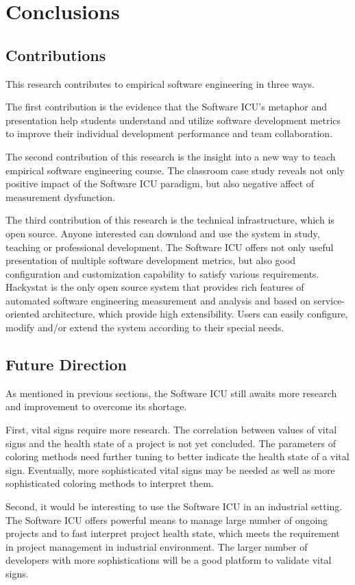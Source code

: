 \chapter{Conclusions}

\section{Contributions}
This research contributes to empirical software engineering in three ways.

The first contribution is the evidence that the Software ICU's metaphor and presentation help students understand and utilize software development metrics to improve their individual development performance and team collaboration.

The second contribution of this research is the insight into a new way to teach empirical software engineering course. The classroom case study reveals not only positive impact of the Software ICU paradigm, but also negative affect of measurement dysfunction.

The third contribution of this research is the technical infrastructure, which is open source. Anyone interested can download and use the system in study, teaching or professional development. The Software ICU offers not only useful presentation of multiple software development metrics, but also good configuration and customization  capability to satisfy various requirements. Hackystat is the only open source system that provides rich features of automated software engineering measurement and analysis and based on service-oriented architecture, which provide high extensibility. Users can easily configure, modify and/or extend the system according to their special needs.


\section{Future Direction}
As mentioned in previous sections, the Software ICU still awaits more research and improvement to overcome its shortage.

First, vital signs require more research. The correlation between values of vital signs and the health state of a project is not yet concluded. The parameters of coloring methods need further tuning to better indicate the health state of a vital sign. Eventually, more sophisticated vital signs may be needed as well as more sophisticated coloring methods to interpret them. 

Second, it would be interesting to use the Software ICU in an industrial setting. The Software ICU offers powerful means to manage large number of ongoing projects and to fast interpret project health state, which meets the requirement in project management in industrial environment. The larger number of developers with more sophistications will be a good platform to validate vital signs. 
 

